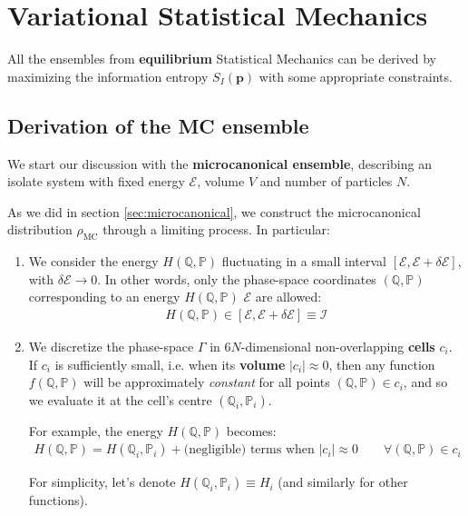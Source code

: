 \documentclass[../../main.tex]{subfiles}
\begin{document}
\section{Variational Statistical Mechanics}
All the ensembles from \textbf{equilibrium} Statistical Mechanics can be derived by maximizing the information entropy $S_I(\bm{p})$ with some appropriate constraints.

\subsection{Derivation of the MC ensemble}
We start our discussion with the \textbf{microcanonical ensemble}, describing an isolate system with fixed energy $\mathcal{E}$, volume $V$ and number of particles $N$.

\medskip
\setlength{\fboxsep}{.3\fboxsep}
As we did in section \ref{sec:microcanonical}, we construct the microcanonical distribution $\rho_{\mathrm{MC}}$ through a limiting process. In particular:
\begin{enumerate}
    \item We consider the energy $H(\mathbb{Q},\mathbb{P})$ fluctuating in a small interval $[\mathcal{E}, \mathcal{E} + \delta \mathcal{E}]$, with $\delta \mathcal{E} \to 0$. In other words, only the phase-space coordinates $(\mathbb{Q}, \mathbb{P})$ corresponding to an energy $H(\mathbb{Q}, \mathbb{P})$  $\mathcal{E}$ are allowed:
    \begin{align*}
        H(\mathbb{Q}, \mathbb{P}) \in [\mathcal{E}, \mathcal{E}+\delta \mathcal{E}] \equiv \mathcal{I}
    \end{align*}
    \item We discretize the phase-space $\Gamma$ in $6N$-dimensional non-overlapping \textbf{cells} $\boxed{c_i}$. If $\boxed{c_i}$ is sufficiently small, i.e. when its \textbf{volume} $|c_i| \approx 0$, then any function $f(\mathbb{Q}, \mathbb{P})$ will be approximately \textit{constant} for all points $(\mathbb{Q}, \mathbb{P}) \in \boxed{c_i}$, and so we evaluate it at the cell's centre $(\mathbb{Q}_i, \mathbb{P}_i)$.
    
    For example, the energy $H(\mathbb{Q}, \mathbb{P})$ becomes:
    \begin{align*}
        H(\mathbb{Q}, \mathbb{P}) = H(\mathbb{Q}_i, \mathbb{P}_i) + \text{(negligible) terms when $|c_i| \approx 0$} \qquad \forall (\mathbb{Q}, \mathbb{P}) \in \boxed{c_i}
    \end{align*}

    For simplicity, let's denote $H(\mathbb{Q}_i,\mathbb{P}_i) \equiv H_i$ (and similarly for other functions).
\end{enumerate}
\end{document}
